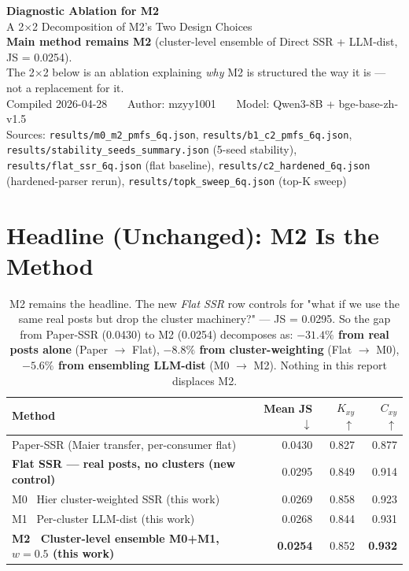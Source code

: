 \documentclass[10pt,a4paper]{article}
\newcommand{\good}[1]{\textcolor{green!50!black}{\textbf{#1}}}
\begin{document}
\begin{center}
{\LARGE \textbf{Diagnostic Ablation for M2}}\\[2pt]
{\Large A 2$\times$2 Decomposition of M2's Two Design Choices}\\[3pt]
{\small \textbf{Main method remains M2} (cluster-level ensemble of Direct SSR + LLM-dist, JS = 0.0254). \\
The 2$\times$2 below is an ablation explaining \emph{why} M2 is structured the way it is — not a replacement for it.}\\[2pt]
{\small Compiled 2026-04-28 \ \textbar\ \ Author: mzyy1001 \ \textbar\ \ Model: Qwen3-8B + bge-base-zh-v1.5}\\[2pt]
{\small Sources: \texttt{results/m0\_m2\_pmfs\_6q.json}, \texttt{results/b1\_c2\_pmfs\_6q.json}, \texttt{results/stability\_seeds\_summary.json} (5-seed stability), \texttt{results/flat\_ssr\_6q.json} (flat baseline), \texttt{results/c2\_hardened\_6q.json} (hardened-parser rerun), \texttt{results/topk\_sweep\_6q.json} (top-K sweep)}
\end{center}

\section{Headline (Unchanged): M2 Is the Method}

\begin{table}[H]
\centering
\small
\begin{tabular}{l r r r}
\toprule
\textbf{Method} & \textbf{Mean JS} $\downarrow$ & \textbf{$K_{xy}$} $\uparrow$ & \textbf{$C_{xy}$} $\uparrow$ \\
\midrule
Paper-SSR (Maier transfer, per-consumer flat)  & 0.0430 & 0.827 & 0.877 \\
\textbf{Flat SSR — real posts, no clusters (new control)} & 0.0295 & 0.849 & 0.914 \\
M0 \ Hier cluster-weighted SSR (this work)     & 0.0269 & 0.858 & 0.923 \\
M1 \ Per-cluster LLM-dist (this work)          & 0.0268 & 0.844 & 0.931 \\
\rowcolor{m2row}
\textbf{M2 \ Cluster-level ensemble M0+M1, $w=0.5$ (this work)} & \good{0.0254} & 0.852 & \good{0.932} \\
\bottomrule
\end{tabular}
\caption{M2 remains the headline. The new \emph{Flat SSR} row controls for "what if we use the same real posts but drop the cluster machinery?" — JS = 0.0295. So the gap from Paper-SSR (0.0430) to M2 (0.0254) decomposes as: \textbf{$-31.4\%$ from real posts alone} (Paper $\to$ Flat), \textbf{$-8.8\%$ from cluster-weighting} (Flat $\to$ M0), \textbf{$-5.6\%$ from ensembling LLM-dist} (M0 $\to$ M2). Nothing in this report displaces M2.}
\end{table}
\end{document}
